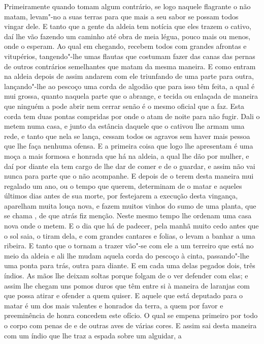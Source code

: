 Primeiramente quando tomam algum contrário, se logo naquele flagrante o
não matam, levam"-no a suas terras para que mais a seu sabor se possam
todos vingar dele. E tanto que a gente da aldeia tem notícia que eles
trazem o cativo, daí lhe vão fazendo um caminho até obra de meia légua,
pouco mais ou menos, onde o esperam. Ao qual em chegando, recebem todos
com grandes afrontas e vitupérios, tangendo"-lhe umas flautas que
costumam fazer das canas das pernas de outros contrários semelhantes que
matam da mesma maneira. E como entram na aldeia depois de assim andarem
com ele triunfando de uma parte para outra, lançando"-lhe ao pescoço uma
corda de algodão que para isso têm feita, a qual é mui grossa, quanto
naquela parte que o abrange, e tecida ou enlaçada de maneira que
ninguém a pode abrir nem cerrar senão é o mesmo oficial que a faz. Esta
corda tem duas pontas compridas por onde o atam de noite para não
fugir. Dali o metem numa casa, e junto da estância daquele que o cativou
lhe armam uma rede, e tanto que nela se lança, cessam todos os agravos
sem haver mais pessoa que lhe faça nenhuma ofensa. E a primeira coisa
que logo lhe apresentam é uma moça a mais formosa e honrada que há na
aldeia, a qual lhe dão por mulher, e daí por diante ela tem cargo de lhe
dar de comer e de o guardar, e assim não vai nunca para parte que o não
acompanhe. E depois de o terem desta maneira mui regalado um ano, ou o
tempo que querem, determinam de o matar e aqueles últimos dias antes
de sua morte, por festejarem a execução desta vingança, aparelham muita
louça nova, e fazem muitos vinhos do sumo de uma planta, que se chama
, de que atrás fiz menção. Neste mesmo tempo lhe ordenam uma casa
nova onde o metem. E o dia que há de padecer, pela manhã muito cedo
antes que o sol saia, o tiram dela, e com grandes cantares e folias, o
levam a banhar a uma ribeira. E tanto que o tornam a trazer vão"-se com
ele a um terreiro que está no meio da aldeia e ali lhe mudam aquela
corda do pescoço à cinta, passando"-lhe uma ponta para trás, outra para
diante. E em cada uma delas pegados dois, três índios. As mãos lhe deixam
soltas porque folgam de o ver defender com elas; e assim lhe chegam uns
pomos duros que têm entre si à maneira de laranjas com que possa atirar
e ofender a quem quiser. E aquele que está deputado para o matar é um
dos mais valentes e honrados da terra, a quem por favor e
preeminência de honra concedem este ofício. O qual se empena primeiro por todo o corpo
com penas de  e de outras aves de várias cores.  E assim sai
desta maneira com um índio que lhe traz a espada sobre um alguidar, a
